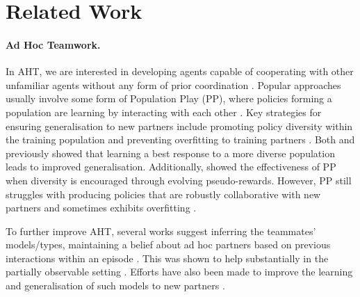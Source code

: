 \section{Related Work}

% 

\paragraph{Ad Hoc Teamwork.}
In AHT, we are interested in developing agents capable of cooperating with other unfamiliar agents without any form of prior coordination \citep{rovatsos_towards_social_complexity_2002,stone_ad_hoc_autonomous_2010, barrett_empirical_evaluation_ad_2011, barrett_making_friends_fly_2017}. Popular approaches usually involve some form of Population Play (PP), where policies forming a population are learning by interacting with each other \citep{lupu_trajectory_diversity_zero_2021, muglich_equivariant_networks_zero_2022, leibo_scalable_evaluation_multi_2021, agapiou_melting_pot_2_2023}. 
Key strategies for ensuring generalisation to new partners include promoting policy diversity within the training population \citep{charakorn_investigating_partner_diversification_2020} and preventing overfitting to training partners \citep{lanctot_unified_game_theoretic_2017}. Both \citet{lupu_trajectory_diversity_zero_2021} and \citet{strouse_collaboration_with_humans_2021} previously showed that learning a best response to a more diverse population leads to improved generalisation. Additionally, \citet{jaderberg_human_level_performance_2019} showed the effectiveness of PP when diversity is encouraged through evolving pseudo-rewards. However, PP still struggles with producing policies that are robustly collaborative with new partners and sometimes exhibits overfitting \citep{carroll_utility_learning_about_2019,leibo_scalable_evaluation_multi_2021,agapiou_melting_pot_2_2023}.

To further improve AHT, several works suggest inferring the teammates' models/types, maintaining a belief about ad hoc partners based on previous interactions within an episode \citep{barrett_empirical_evaluation_ad_2011, albrecht_empirical_study_practical_2015}. This was shown to help substantially in the partially observable setting \citep{gu_online_ad_hoc_2021, ribeiro_making_friends_dark_2023, dodampegama_knowledge_based_reasoning_2023}. Efforts have also been made to improve the learning and generalisation of such models to new partners \citep{barrett_cooperating_unknown_teammates_2015, barrett_making_friends_fly_2017, muglich_generalized_beliefs_cooperative_2022}.

